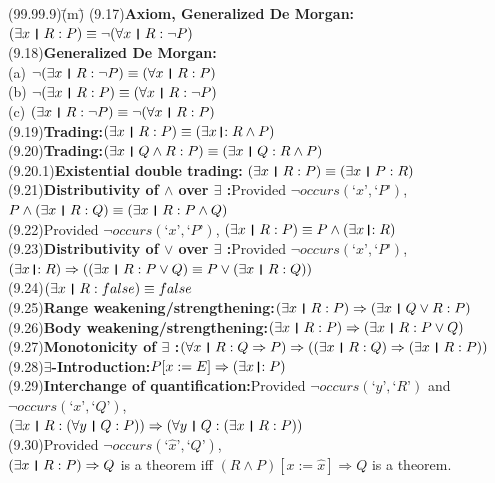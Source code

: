 \documentclass{amsart}
\newcommand{\lgap}{2pt}                             %
\newcommand{\impl}{\ensuremath{\Rightarrow}}        %
\newcommand{\thedr}{\rule[-.25ex]{.32mm}{1.75ex}}   %
\newcommand{\dr}{\;\,\thedr\,\;}                    %
\newcommand{\rb}{:}                                 %
\newcommand{\drrb}{\;\thedr\,{:}\;}                 %
\newcommand{\all}{\forall}                          %
\newcommand{\ext}{\exists}                          %
\newcommand{\Lq}{\mbox{`}}
\newcommand{\Rq}{\mbox{'}}
\begin{document}
\begin{tabbing}
(99.99.9)\;\=(m)\;\=\kill
(9.17)\>\textbf{Axiom, Generalized De Morgan:}\quad $(\ext x\dr R\rb P)\equiv \neg (\all x\dr R\rb \neg P)$\\[\lgap]
(9.18)\>\textbf{Generalized De Morgan:}\\[\lgap]
      \> (a)\> $\neg (\ext x\dr R\rb \neg P)\equiv (\all x\dr R\rb P)$\\[\lgap]
      \> (b)\> $\neg (\ext x\dr R\rb P)\equiv (\all x\dr R\rb \neg P)$\\[\lgap]
      \> (c)\> $(\ext x\dr R\rb \neg P)\equiv \neg (\all x\dr R\rb P)$\\[\lgap]
(9.19)\>\textbf{Trading:}\quad $(\ext x\dr R\rb P)\equiv (\ext x\drrb R\land P)$\\[\lgap]
(9.20)\>\textbf{Trading:}\quad $(\ext x\dr Q\land R\rb P)\equiv (\ext x\dr Q\rb R\land P)$\\[\lgap]
(9.20.1)\>\textbf{Existential double trading:} \quad $(\ext x\dr R\rb P)\equiv (\ext x\dr P \rb R)$\\[\lgap]
(9.21)\>\textbf{Distributivity of $\land$ over $\ext$ :}\quad Provided $\neg occurs(\Lq x\Rq ,\Lq P\Rq)$,\\[\lgap]
      \>$P\land (\ext x\dr R\rb Q)\equiv (\ext x\dr R\rb P\land Q)$\\[\lgap]
(9.22)\>Provided $\neg occurs(\Lq x\Rq ,\Lq P\Rq)$, \quad $(\ext x\dr R\rb P)\equiv P\land (\ext x\drrb R)$\\[\lgap]
(9.23)\>\textbf{Distributivity of $\lor$ over $\ext$ :}\quad Provided $\neg occurs(\Lq x\Rq ,\Lq P\Rq)$,\\[\lgap]
      \>$(\ext x\drrb R)\impl ((\ext x\dr R\rb P\lor Q)\equiv P\lor (\ext x\dr R\rb Q))$\\[\lgap]
(9.24)\>$(\ext x\dr R\rb false)\equiv false$\\[\lgap]
(9.25)\>\textbf{Range weakening/strengthening:}\quad $(\ext x\dr R\rb P)\impl (\ext x\dr Q\lor R\rb P)$\\[\lgap]
(9.26)\>\textbf{Body weakening/strengthening:}\quad $(\ext x\dr R\rb P)\impl (\ext x\dr R\rb P\lor Q)$\\[\lgap]
(9.27)\>\textbf{Monotonicity of $\ext$ :}\quad $(\all x\dr R\rb Q\impl P)\impl ((\ext x\dr R\rb Q)\impl (\ext x\dr R\rb P))$\\[\lgap]
(9.28)\>\textbf{$\ext$-Introduction:}\quad $P[x:=E]\impl (\ext x\drrb P)$\\[\lgap]
(9.29)\>\textbf{Interchange of quantification:}\quad Provided $\neg occurs(\Lq y\Rq ,\Lq R\Rq)$ and $\neg occurs(\Lq x\Rq ,\Lq Q\Rq)$,\\[\lgap]
      \>$(\ext x\dr R\rb (\all y\dr Q\rb P))\impl (\all y\dr Q\rb (\ext x\dr R\rb P))$\\[\lgap]
(9.30)\>Provided $\neg occurs(\Lq \hat{x}\Rq ,\Lq Q\Rq)$,\\[\lgap]
      \>$(\ext x\dr R\rb P)\impl Q$ is a theorem iff $(R\land P)[x:=\hat{x}]\impl Q$ is a theorem.\\[\lgap]
\end{tabbing}
\end{document}
